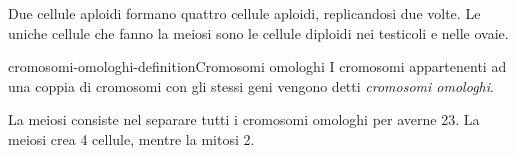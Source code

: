 \documentclass[preview]{standalone}
\begin{document}
\begin{plainhtml}
    Due cellule aploidi formano quattro cellule aploidi, replicandosi due volte.
    Le uniche cellule che fanno la meiosi sono le cellule diploidi nei testicoli e nelle ovaie.
\end{plainhtml}

\begin{snippetdefinition}{cromosomi-omologhi-definition}{Cromosomi omologhi}
    I cromosomi appartenenti ad una coppia di cromosomi con gli stessi geni vengono detti
    \textit{cromosomi omologhi}.
\end{snippetdefinition}

\begin{plainhtml}
    La meiosi consiste nel separare tutti i cromosomi omologhi per averne 23.
    La meiosi crea 4 cellule, mentre la mitosi 2.
\end{plainhtml}
\end{document}
